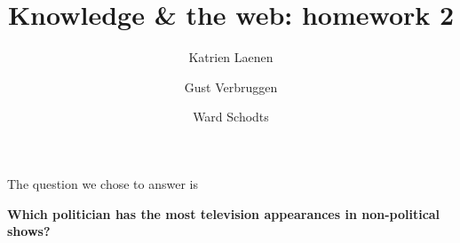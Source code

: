 \documentclass[11pt,a4paper]{article}
\author{
  Katrien Laenen\\
  \and
  Gust Verbruggen\\
  \and
  Ward Schodts
}
\title{Knowledge \& the web: homework 2}
\begin{document}
\maketitle

The question we chose to answer is 

\begin{center}
\bf \Large Which politician has the most television appearances in non-political shows?
\end{center}
\end{document}

